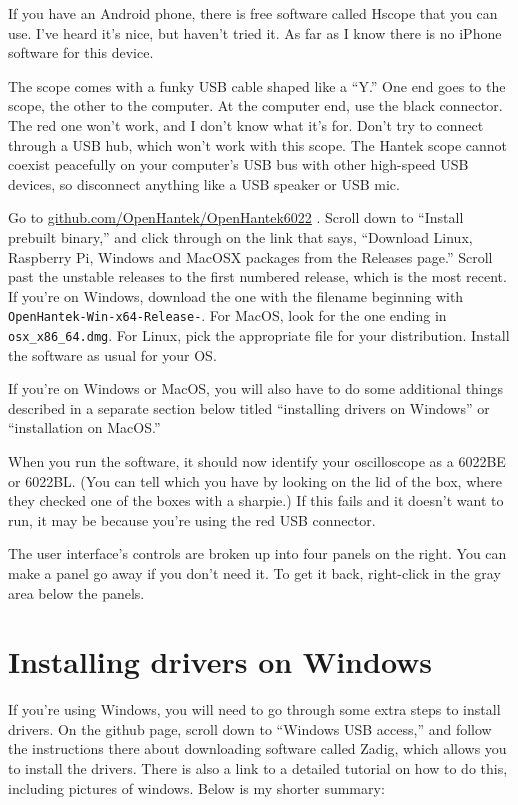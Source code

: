 If you have an Android phone, there is
free software called Hscope that you can use. I've heard it's nice, but haven't tried it.
As far as I know there is no iPhone software for this device.

The scope comes with a funky USB cable shaped like a ``Y.'' One end goes to the
scope, the other to the computer. At the computer end, use the black connector. The red
one won't work, and I don't know what it's for.
Don't try to connect through a USB hub, which won't work with this scope.
The Hantek scope cannot coexist peacefully on your computer's USB bus with other
high-speed USB devices, so disconnect anything like a USB speaker or USB mic.

Go to \url{github.com/OpenHantek/OpenHantek6022} . Scroll down to ``Install prebuilt binary,''
and click through on the link that says, ``Download Linux, Raspberry Pi, Windows and MacOSX packages from the Releases page.''
Scroll past the unstable releases to the first numbered release, which is the most recent.
If you're on Windows, download the one with the filename beginning with {\tt OpenHantek-Win-x64-Release-}.
For MacOS, look for the one ending in {\tt osx\_x86\_64.dmg}. For Linux, pick the appropriate file
for your distribution.
Install the software as usual for your OS.

If you're on Windows or MacOS, you will also have to do some additional things
described in a separate section below titled ``installing drivers on Windows''
or ``installation on MacOS.''


When you run the software, it should now identify your oscilloscope as a 6022BE or
6022BL. (You can tell which you have by looking on the lid of the box, where they
checked one of the boxes with a sharpie.) If this fails and it doesn't want to run,
it may be because you're using the red USB connector.

The user interface's controls are broken up into four panels on the
right.  You can make a panel go away if you don't need it. To get it
back, right-click in the gray area below the panels.

\section*{Installing drivers on Windows}

If you're using Windows, you will need to go through some extra steps to install drivers.
On the github page, scroll down to
``Windows USB access,'' and follow the instructions there about downloading software called Zadig,
which allows you to install the drivers. There is also a link to a detailed tutorial
on how to do this, including pictures of windows. Below is my shorter summary:

